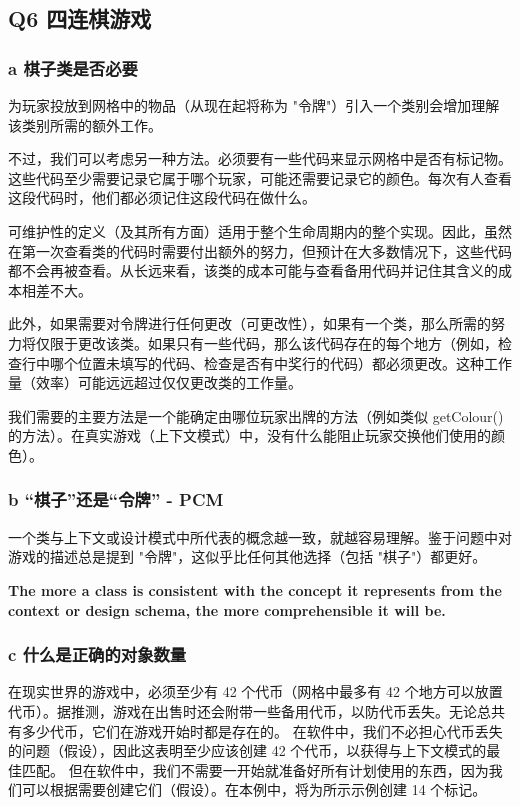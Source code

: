 \subsection{Q6 四连棋游戏}

\subsubsection{a 棋子类是否必要}

为玩家投放到网格中的物品（从现在起将称为 "令牌"）引入一个类别会增加理解该类别所需的额外工作。

不过，我们可以考虑另一种方法。必须要有一些代码来显示网格中是否有标记物。这些代码至少需要记录它属于哪个玩家，可能还需要记录它的颜色。每次有人查看这段代码时，他们都必须记住这段代码在做什么。

可维护性的定义（及其所有方面）适用于整个生命周期内的整个实现。因此，虽然在第一次查看类的代码时需要付出额外的努力，但预计在大多数情况下，这些代码都不会再被查看。从长远来看，该类的成本可能与查看备用代码并记住其含义的成本相差不大。

此外，如果需要对令牌进行任何更改（可更改性），如果有一个类，那么所需的努力将仅限于更改该类。如果只有一些代码，那么该代码存在的每个地方（例如，检查行中哪个位置未填写的代码、检查是否有中奖行的代码）都必须更改。这种工作量（效率）可能远远超过仅仅更改类的工作量。

我们需要的主要方法是一个能确定由哪位玩家出牌的方法（例如类似 getColour()的方法）。在真实游戏（上下文模式）中，没有什么能阻止玩家交换他们使用的颜色）。

\subsubsection{b “棋子”还是“令牌” - PCM}
一个类与上下文或设计模式中所代表的概念越一致，就越容易理解。鉴于问题中对游戏的描述总是提到 "令牌"，这似乎比任何其他选择（包括 "棋子"）都更好。

\textbf{The more a class is consistent with the concept it represents from the context or design schema, the more comprehensible it will be.}

\subsubsection{c 什么是正确的对象数量}

在现实世界的游戏中，必须至少有 42 个代币（网格中最多有 42 个地方可以放置代币）。据推测，游戏在出售时还会附带一些备用代币，以防代币丢失。无论总共有多少代币，它们在游戏开始时都是存在的。
在软件中，我们不必担心代币丢失的问题（假设），因此这表明至少应该创建 42 个代币，以获得与上下文模式的最佳匹配。
但在软件中，我们不需要一开始就准备好所有计划使用的东西，因为我们可以根据需要创建它们（假设）。在本例中，将为所示示例创建 14 个标记。

